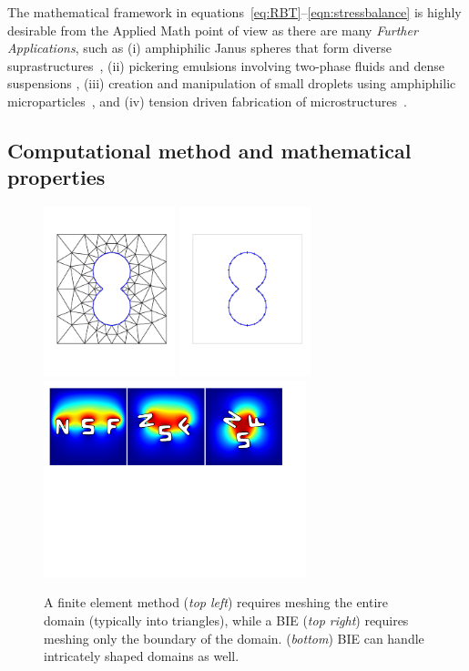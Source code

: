 The mathematical framework in
equations~\eqref{eq:RBT}--\eqref{eqn:stressbalance} is highly desirable
from the Applied Math point of view as there are many \emph{Further
Applications}, such as (i) amphiphilic Janus spheres that form diverse
suprastructures~\cite{HaBr20, McBr21, Bradley2017}, (ii) pickering
emulsions involving two-phase fluids and dense suspensions
\cite{Bradley2016}, (iii) creation and manipulation of small droplets
using amphiphilic microparticles~\cite{Ha2022SurfaceEM,
Ha2020MinimalSC}, and (iv) tension driven fabrication of
microstructures~\cite{Dasgupta2017, Leong2007, Reynolds2019, Cho2010,
Zeng20223DprintedMT, Russell2016EnergyLF}.

\subsection{Computational method and mathematical properties}
\begin{figure}
  \vspace{-8pt}
  \centering
  \includegraphics[width=1.5in]{figures/Background/Peanut/PeanutFEM.pdf}
  \includegraphics[width=1.5in]{figures/Background/Peanut/PeanutIE.pdf}\\
  \includegraphics[width=3in]{figures/Background/NSF.pdf}\\
\caption{\label{fig:fem_vs_bie} \footnotesize A finite element method
  ({\em top left}) requires meshing the entire domain (typically into
  triangles), while a BIE ({\em top right}) requires meshing only the
  boundary of the domain.
  ({\em bottom}) BIE can handle intricately shaped domains as well.}
\end{figure}
